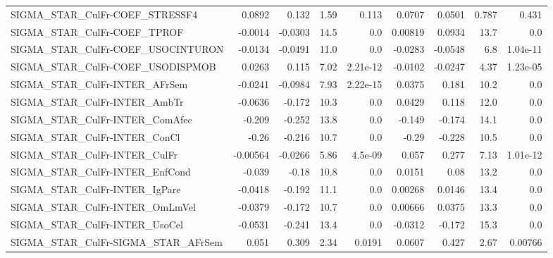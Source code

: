 \begin{tabular}{lrrrrrrrr}
SIGMA\_STAR\_CulFr-COEF\_STRESSF4        &      0.0892 &        0.132 &     1.59 &    0.113 &     0.0707 &      0.0501 &        0.787 &         0.431 \\
SIGMA\_STAR\_CulFr-COEF\_TPROF           &     -0.0014 &      -0.0303 &     14.5 &      0.0 &    0.00819 &      0.0934 &         13.7 &           0.0 \\
SIGMA\_STAR\_CulFr-COEF\_USOCINTURON     &     -0.0134 &      -0.0491 &     11.0 &      0.0 &    -0.0283 &     -0.0548 &          6.8 &      1.04e-11 \\
SIGMA\_STAR\_CulFr-COEF\_USODISPMOB      &      0.0263 &        0.115 &     7.02 & 2.21e-12 &    -0.0102 &     -0.0247 &         4.37 &      1.23e-05 \\
SIGMA\_STAR\_CulFr-INTER\_AFrSem         &     -0.0241 &      -0.0984 &     7.93 & 2.22e-15 &     0.0375 &       0.181 &         10.2 &           0.0 \\
SIGMA\_STAR\_CulFr-INTER\_AmbTr          &     -0.0636 &       -0.172 &     10.3 &      0.0 &     0.0429 &       0.118 &         12.0 &           0.0 \\
SIGMA\_STAR\_CulFr-INTER\_ComAfec        &      -0.209 &       -0.252 &     13.8 &      0.0 &     -0.149 &      -0.174 &         14.1 &           0.0 \\
SIGMA\_STAR\_CulFr-INTER\_ConCl          &       -0.26 &       -0.216 &     10.7 &      0.0 &      -0.29 &      -0.228 &         10.5 &           0.0 \\
SIGMA\_STAR\_CulFr-INTER\_CulFr          &    -0.00564 &      -0.0266 &     5.86 &  4.5e-09 &      0.057 &       0.277 &         7.13 &      1.01e-12 \\
SIGMA\_STAR\_CulFr-INTER\_EnfCond        &      -0.039 &        -0.18 &     10.8 &      0.0 &     0.0151 &        0.08 &         13.2 &           0.0 \\
SIGMA\_STAR\_CulFr-INTER\_IgPare         &     -0.0418 &       -0.192 &     11.1 &      0.0 &    0.00268 &      0.0146 &         13.4 &           0.0 \\
SIGMA\_STAR\_CulFr-INTER\_OmLmVel        &     -0.0379 &       -0.172 &     10.7 &      0.0 &    0.00666 &      0.0375 &         13.3 &           0.0 \\
SIGMA\_STAR\_CulFr-INTER\_UsoCel         &     -0.0531 &       -0.241 &     13.4 &      0.0 &    -0.0312 &      -0.172 &         15.3 &           0.0 \\
SIGMA\_STAR\_CulFr-SIGMA\_STAR\_AFrSem    &       0.051 &        0.309 &     2.34 &   0.0191 &     0.0607 &       0.427 &         2.67 &       0.00766 \\

\end{tabular}
